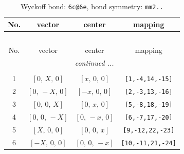 \documentclass[fleqn,8pt]{jsarticle}
\begin{document}
\begin{longtable}{cccc}
\caption{Wyckoff bond: {\tt 6c@6e}, bond symmetry: {\tt mm2..}}
 \\
 \hline \hline
No. & vector & center & mapping \\ \hline \endfirsthead

\multicolumn{3}{l}{\tablename\ \thetable{}} \\
 \hline \hline
No. & vector & center & mapping \\ \hline \endhead

 \hline \hline
\multicolumn{3}{r}{\footnotesize\it continued ...} \\ \endfoot

 \hline \hline
\multicolumn{3}{r}{} \\ \endlastfoot

1 & $\left[ 0,\, X,\, 0 \right]$ & $\left[ x,\, 0,\, 0 \right]$ & {\tt [1,-4,14,-15]} \\ \hline
2 & $\left[ 0,\, - X,\, 0 \right]$ & $\left[ - x,\, 0,\, 0 \right]$ & {\tt [2,-3,13,-16]} \\ \hline
3 & $\left[ 0,\, 0,\, X \right]$ & $\left[ 0,\, x,\, 0 \right]$ & {\tt [5,-8,18,-19]} \\ \hline
4 & $\left[ 0,\, 0,\, - X \right]$ & $\left[ 0,\, - x,\, 0 \right]$ & {\tt [6,-7,17,-20]} \\ \hline
5 & $\left[ X,\, 0,\, 0 \right]$ & $\left[ 0,\, 0,\, x \right]$ & {\tt [9,-12,22,-23]} \\ \hline
6 & $\left[ - X,\, 0,\, 0 \right]$ & $\left[ 0,\, 0,\, - x \right]$ & {\tt [10,-11,21,-24]} \\
\end{longtable}
\renewcommand{\arraystretch}{1.2}
\end{document}
